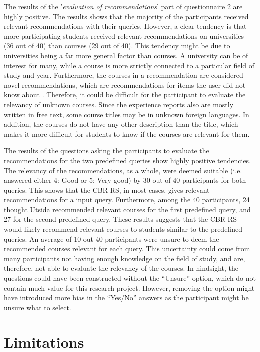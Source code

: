 The results of the '\textit{evaluation of recommendations}' part of questionnaire 2 are highly positive. The results shows that the majority of the participants received relevant recommendations with their queries. However, a clear tendency is that more participating students received relevant recommendations on universities (36 out of 40) than courses (29 out of 40). This tendency might be due to universities being a far more general factor than courses. A university can be of interest for many, while a course is more strictly connected to a particular field of study and year. Furthermore, the courses in a recommendation are considered novel recommendations, which are recommendations for items the user did not know about \cite{shani2011evaluating}. Therefore, it could be difficult for the participant to evaluate the relevancy of unknown courses. Since the experience reports also are mostly written in free text, some course titles may be in unknown foreign languages. In addition, the courses do not have any other description than the title, which makes it more difficult for students to know if the courses are relevant for them. 

The results of the questions asking the participants to evaluate the recommendations for the two predefined queries show highly positive tendencies. The relevancy of the recommendations, as a whole, were deemed suitable (i.e. answered either 4: Good or 5: Very good) by 30 out of 40 participants for both queries. This shows that the CBR-RS, in most cases, gives relevant recommendations for a input query. Furthermore, among the 40 participants, 24 thought Utsida recommended relevant courses for the first predefined query, and 27 for the second predefined query. These results suggests that the CBR-RS would likely recommend relevant courses to students similar to the predefined queries. An average of 10 out 40 participants were unsure to deem the recommended courses relevant for each query. This uncertainty could come from many participants not having enough knowledge on the field of study, and are, therefore, not able to evaluate the relevancy of the courses. In hindsight, the questions could have been constructed without the \enquote{Unsure} option, which do not contain much value for this research project. However, removing the option might have introduced more bias in the \enquote{Yes/No} answers as the participant might be unsure what to select. 

\section{Limitations}\label{sec:limitations}

